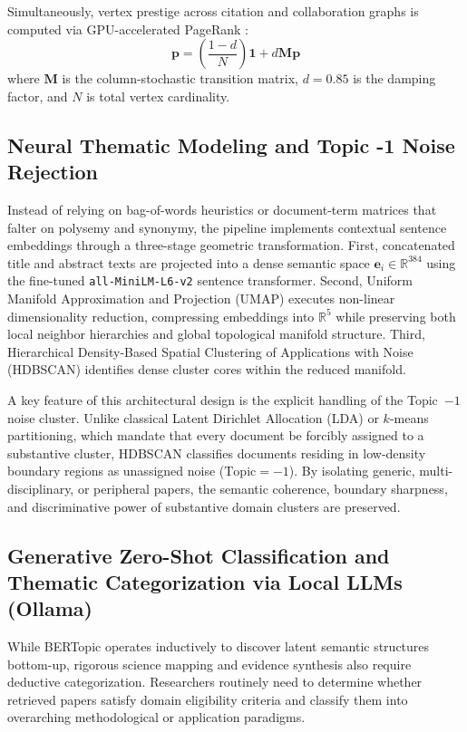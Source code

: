 \documentclass[preprint,12pt]{elsarticle}
\begin{document}
Simultaneously, vertex prestige across citation and collaboration graphs is computed via GPU-accelerated PageRank \cite{page1999pagerank}:
\begin{equation}
\mathbf{p} = \left(\frac{1-d}{N}\right) \mathbf{1} + d \mathbf{M} \mathbf{p}
\end{equation}
where $\mathbf{M}$ is the column-stochastic transition matrix, $d = 0.85$ is the damping factor, and $N$ is total vertex cardinality.

\subsection{Neural Thematic Modeling and Topic -1 Noise Rejection}
Instead of relying on bag-of-words heuristics or document-term matrices that falter on polysemy and synonymy, the pipeline implements contextual sentence embeddings through a three-stage geometric transformation. First, concatenated title and abstract texts are projected into a dense semantic space $\mathbf{e}_i \in \mathbb{R}^{384}$ using the fine-tuned \texttt{all-MiniLM-L6-v2} sentence transformer. Second, Uniform Manifold Approximation and Projection (UMAP) executes non-linear dimensionality reduction, compressing embeddings into $\mathbb{R}^{5}$ while preserving both local neighbor hierarchies and global topological manifold structure. Third, Hierarchical Density-Based Spatial Clustering of Applications with Noise (HDBSCAN) identifies dense cluster cores within the reduced manifold.

A key feature of this architectural design is the explicit handling of the Topic~$-1$ noise cluster. Unlike classical Latent Dirichlet Allocation (LDA) or $k$-means partitioning, which mandate that every document be forcibly assigned to a substantive cluster, HDBSCAN classifies documents residing in low-density boundary regions as unassigned noise ($\text{Topic} = -1$). By isolating generic, multi-disciplinary, or peripheral papers, the semantic coherence, boundary sharpness, and discriminative power of substantive domain clusters are preserved.

\subsection{Generative Zero-Shot Classification and Thematic Categorization via Local LLMs (Ollama)}
While BERTopic operates inductively to discover latent semantic structures bottom-up, rigorous science mapping and evidence synthesis also require deductive categorization. Researchers routinely need to determine whether retrieved papers satisfy domain eligibility criteria and classify them into overarching methodological or application paradigms.
\end{document}
